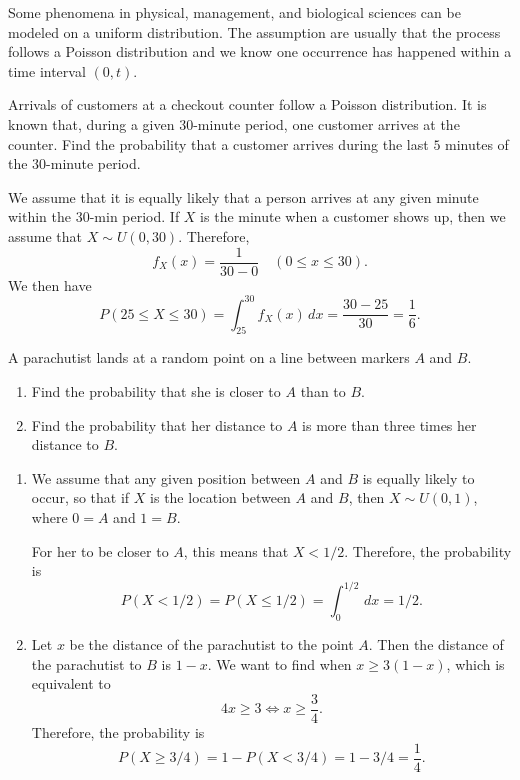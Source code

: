 Some phenomena in physical, management, and biological sciences can be modeled on a uniform distribution. The assumption are usually that the process follows a Poisson distribution and we know one occurrence has happened within a time interval $(0, t)$.

\begin{example}
Arrivals of customers at a checkout counter follow a Poisson distribution. It is known that, during a given $30$-minute period, one customer arrives at the counter. Find the probability that a customer arrives during the last $5$ minutes of the $30$-minute period.
\end{example}

\begin{sol*}
We assume that it is equally likely that a person arrives at any given minute within the $30$-min period. If $X$ is the minute when a customer shows up, then we assume that $X \sim U (0, 30)$. Therefore,
    \[
        f_X (x) = \frac{1}{30 - 0} \quad (0 \leq x \leq 30 ) .
    \]
We then have
    \[
        P (25 \leq X \leq 30) = \int_{25}^{30} f_X (x) \, dx = \frac{30 - 25}{30} = \frac{1}{6} . \tag*{$\triangle$}
    \]
\end{sol*}

\begin{example}
A parachutist lands at a random point on a line between markers $A$ and $B$. 
    \begin{enumerate}[label=\alph*)]
    \item Find the probability that she is closer to $A$ than to $B$.
    \item Find the probability that her distance to $A$ is more than three times her distance to $B$.
    \end{enumerate}
\end{example}

\begin{sol*}
\begin{enumerate}[label=\alph*)]
\item We assume that any given position between $A$ and $B$ is equally likely to occur, so that if $X$ is the location between $A$ and $B$, then $X \sim U (0, 1)$, where $0 = A$ and $1= B$. 

For her to be closer to $A$, this means that $X < 1/2$. Therefore, the probability is
    \[
        P (X < 1/2) = P (X \leq 1/2) = \int_0^{1/2} \, dx = 1/2 .
    \]
\item Let $x$ be the distance of the parachutist to the point $A$. Then the distance of the parachutist to $B$ is $1 - x$. We want to find when $x \geq 3 (1 - x)$, which is equivalent to 
    \[
        4x \geq 3 \iff x \geq \frac{3}{4} .
    \]
Therefore, the probability is
    \[
        P (X \geq 3/4 ) = 1 - P (X < 3/4) = 1 - 3/4 = \frac{1}{4} . \tag*{$\triangle$}
    \]
\end{enumerate}
\end{sol*}

